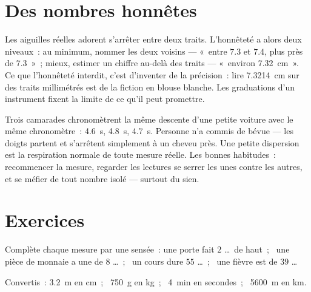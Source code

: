 \section{Des nombres honnêtes}

\begin{remark}\label{rem:g6:measurement-in-science:between}
Les aiguilles réelles adorent s'arrêter entre deux traits.
L'honnêteté a alors deux niveaux~: au minimum, nommer les deux
voisins --- «~entre $7.3$ et $7.4$, plus près de $7.3$~»~; mieux,
estimer un chiffre au-delà des traits --- «~environ \qty{7.32}{cm}~».
Ce que l'honnêteté interdit, c'est d'inventer de la précision~: lire
\qty{7.3214}{cm} sur des traits millimétrés est de la fiction en
blouse blanche. Les graduations d'un instrument fixent la limite de
ce qu'il peut promettre.
\end{remark}

\begin{example}\label{ex:g6:measurement-in-science:repeat}
Trois camarades chronomètrent la même descente d'une petite voiture
avec le même chronomètre~: \qty{4.6}{s}, \qty{4.8}{s}, \qty{4.7}{s}.
Personne n'a commis de bévue --- les doigts partent et s'arrêtent
simplement à un cheveu près. Une petite dispersion est la respiration
normale de toute mesure réelle. Les bonnes habitudes~: recommencer la
mesure, regarder les lectures se serrer les unes contre les autres,
et se méfier de tout nombre isolé --- surtout du sien.
\end{example}

\section{Exercices}

\begin{exercise}[$\star$]\label{exo:g6:measurement-in-science:1}
Complète chaque mesure par une  sensée~: une porte fait $2$
\dots\ de haut~; \ une pièce de monnaie a une  de $8$ \dots~;
\ un cours dure $55$ \dots~; \ une fièvre est de $39$ \dots
\end{exercise}

\begin{exercise}[$\star$]\label{exo:g6:measurement-in-science:2}
Convertis~: \qty{3.2}{m} en \unit{cm}~; \ \qty{750}{g} en \unit{kg}~;
\ \qty{4}{min} en secondes~; \ \qty{5600}{m} en \unit{km}.
\end{exercise}

